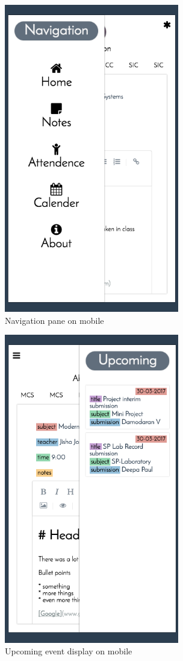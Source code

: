 \begin{figure}[htb]
    \centering
    \includegraphics[width=3in]{mobilenav.png}
    \caption{Navigation pane on mobile}
    \label{fig:mobilenav} %
\end{figure}

\begin{figure}[htb]
    \centering
    \includegraphics[width=3in]{mobileupcoming.png}
    \caption{Upcoming event display on mobile}
    \label{fig:mobileupcoming} %
\end{figure}

